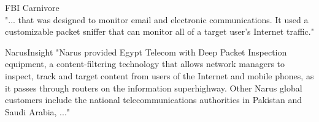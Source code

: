 \documentclass[20pt,landscape,a4paper,footrule]{foils}
\begin{document}

\begin{list1}
\item FBI Carnivore\\
"... that was designed to monitor email and electronic communications. It used a customizable packet sniffer that can monitor all of a target user's Internet traffic."

\item NarusInsight
"Narus provided Egypt Telecom with Deep Packet Inspection equipment, a content-filtering technology that allows network managers to inspect, track and target content from users of the Internet and mobile phones, as it passes through routers on the information superhighway. Other Narus global customers include the national telecommunications authorities in Pakistan and Saudi Arabia, ..."\\

\end{list1}
\end{document}
